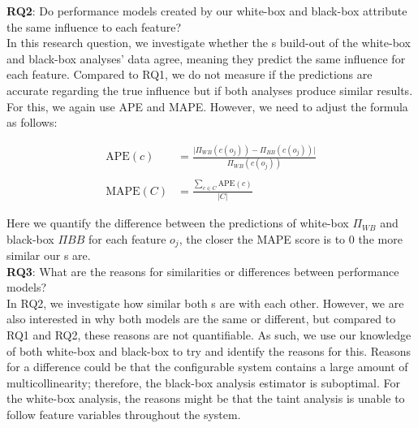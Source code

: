 \noindent \textbf{RQ2}: Do performance models created by our white-box and black-box attribute the same influence to each feature?\\

In this research question, we investigate whether the {\perfInfluenceModel}s build-out of the white-box and black-box analyses' data agree, 
meaning they predict the same influence for each feature. 
Compared to RQ1, we do not measure if the predictions are accurate regarding the true influence but if both analyses produce similar results. 
For this, we again use APE and MAPE. However, we need to adjust the formula as follows:

\begin{align}
    \text{APE}(c) &= \frac{\lvert\Pi_{WB}(c(o_j)) - \Pi_{BB}(c(o_j))\rvert}{\Pi_{WB}(c(o_j))} \label{equ:APE} \\ \nonumber \\
    \text{MAPE}(C) &= \frac{\sum_{c \in C} \text{APE}(c)}{\lvert C \rvert} \label{equ:mape}
\end{align}

Here we quantify the difference between the predictions of white-box $\Pi_{WB}$ and black-box $\Pi{BB}$ for each feature $o_j$, 
the closer the MAPE score is to $0$ the more similar our {\perfInfluenceModel}s are.\\

\noindent \textbf{RQ3}: What are the reasons for similarities or differences between performance models?\\

In RQ2, we investigate how similar both {\perfInfluenceModel}s are with each other. 
However, we are also interested in why both models are the same or different, but compared to RQ1 and RQ2, these reasons are not quantifiable. 
As such, we use our knowledge of both white-box and black-box to try and identify the reasons for this. Reasons for a difference could be 
that the configurable system contains a large amount of multicollinearity; therefore, the black-box analysis estimator is suboptimal. 
For the white-box analysis, the reasons might be that the taint analysis is unable to follow feature variables throughout the system.
